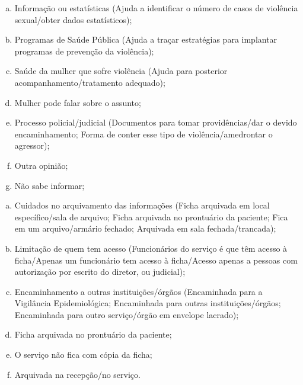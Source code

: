 \documentclass{article}
\begin{document}
\begin{enumerate}[a)]
\item
Informação ou estatísticas (Ajuda a identificar o número de casos de violência
sexual/obter dados estatísticos);

\item
Programas de Saúde Pública (Ajuda a traçar estratégias para implantar programas
de prevenção da violência);

\item
Saúde da mulher que sofre violência (Ajuda para posterior
acompanhamento/tratamento adequado);

\item
Mulher pode falar sobre o assunto;

\item
Processo policial/judicial (Documentos para tomar providências/dar o devido
encaminhamento; Forma de conter esse tipo de violência/amedrontar o agressor);

\item
Outra opinião;

\item
Não sabe informar;

\end{enumerate}
\begin{enumerate}[a)]
\item
Cuidados no arquivamento das informações (Ficha arquivada em local
específico/sala de arquivo; Ficha arquivada no prontuário da paciente; Fica em
um arquivo/armário fechado; Arquivada em sala fechada/trancada);

\item
Limitação de quem tem acesso (Funcionários do serviço é que têm acesso à
ficha/Apenas um funcionário tem acesso à ficha/Acesso apenas a pessoas com
autorização por escrito do diretor, ou judicial);

\item
Encaminhamento a outras instituições/órgãos (Encaminhada para a Vigilância
Epidemiológica; Encaminhada para outras instituições/órgãos; Encaminhada para
outro serviço/órgão em envelope lacrado);

\item
Ficha arquivada no prontuário da paciente;

\item
O serviço não fica com cópia da ficha;

\item
Arquivada na recepção/no serviço.

\end{enumerate}
\end{document}
